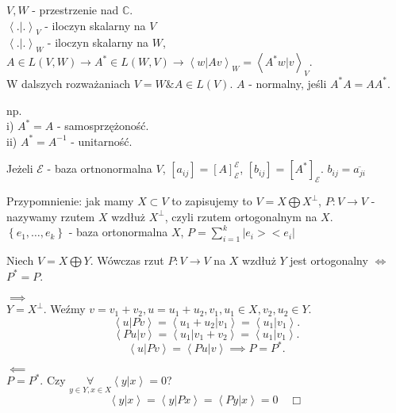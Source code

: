 \documentclass[../main.tex]{subfiles}
\begin{document}
    $V,W$ - przestrzenie nad $\mathbb{C}$.\\
    $\left<.|. \right>_V$ - iloczyn skalarny na $V$\\
    $\left<.|. \right>_W$ - iloczyn skalarny na $W$,\\
    $A\in L(V,W) \to A^*\in L(W,V)\to \left<w|Av \right>_W = \left<A^*w|v \right>_V$. \\
    W dalszych rozważaniach $V = W \& A\in L(V)$.  $A$ - normalny, jeśli $A^*A = AA^*$.\\
    \begin{przyklad}
        np.\\
        i) $A^* = A$ - samosprzężoność.\\
        ii) $A^* = A^{-1}$ - unitarność.
    \end{przyklad}
Jeżeli $\mathcal{E}$ - baza ortnonormalna $V$, $[a_{ij}] = [A]_\mathcal{E}^\mathcal{E}$, $[b_{ij}] = [A^*]_\mathcal{E}$. $b_{ij} = \overline{a_{ji}}$

Przypomnienie:
jak mamy $X\subset V$ to zapisujemy to $V =  X \bigoplus X^\perp$, $P: V\to V$ - nazywamy rzutem $X$ wzdłuż $X^\perp$, czyli rzutem ortogonalnym na $X$.\\
$\left\{ e_1,\ldots,e_k \right\} $ - baza ortonormalna $X$, $P = \sum_{i=1}^{k}|e_i><e_i|$

\begin{stw}
    Niech $V = X \bigoplus Y$. Wówczas rzut $P: V\to V$ na $X$ wzdłuż $Y$ jest ortogonalny $\iff$ $P^* = P$.
\end{stw}
\begin{dowod}
    $\implies$ \\
    $Y = X^\perp$. Weźmy  $v = v_1+v_2, u = u_1+u_2, v_1,u_1\in X, v_2,u_2\in Y$.
    \[
    \left<u|Pv \right> = \left<u_1+u_2 | v_1 \right> = \left<u_1|v_1 \right>
    .\]
    \[
    \left<Pu|v \right> = \left<u_1|v_1+v_2 \right> = \left<u_1|v_1 \right>
    .\]
    \[
    \left<u|Pv \right> = \left<Pu|v \right> \implies P = P^*
    .\]

    $\impliedby$ \\
    $P = P^*$. Czy $\underset{y\in Y, x\in X}{\forall} \left<y|x \right> = 0$?
    \[
    \left<y|x \right> = \left<y|Px \right> = \left<Py|x \right> = 0\quad\Box
    \]
\end{dowod}
\end{document}
